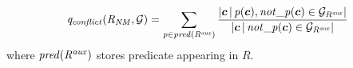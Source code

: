 \begin{equation}
\mi{q_{conflict}(R_{\mi{NM}},\cG)=\sum_{p\in pred(R^{\mi{aux}})} \dfrac{|\vec{c}\,|\,p(\vec{c}),not\_p(\vec{c})\in \cG_{R^{\mi{aux}}}|}{|\vec{c}\,|\,not\_p(\vec{c})\in \cG_{R^{\mi{aux}}}|}}
\end{equation}
where $\mathit{pred(R^{aux})}$ stores predicate appearing in $R$.

